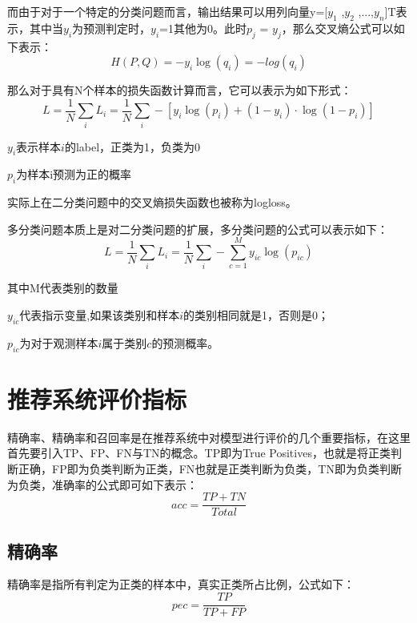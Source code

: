 而由于对于一个特定的分类问题而言，输出结果可以用列向量y=[$y_{1}$ ,$y_{2}$ ,...,$y_{n}$]$\mathrm{T}$表示，其中当$y_{i}$为预测判定时，$y_{i}$=1其他为0。此时$p_{j}$ = $y_{j}$，那么交叉熵公式可以如下表示：
\begin{equation}
  H(P, Q) = -y_{i}\log(q_{i}) = -log(q_{i})
\end{equation}

那么对于具有N个样本的损失函数计算而言，它可以表示为如下形式：
\begin{equation}
  L = \frac{1}{N}{\sum_{i} L_{i}} = \frac{1}{N}{\sum_{i} -[y_{i}\log(p_{i}) + (1 - y_{i}) \cdot {\log(1-p_{i})}]}
\end{equation}

$y_{i}$表示样本$i$的label，正类为1，负类为0

$p_{i}$为样本i预测为正的概率

实际上在二分类问题中的交叉熵损失函数也被称为logloss。

多分类问题本质上是对二分类问题的扩展，多分类问题的公式可以表示如下：
\begin{equation}
  L = \frac{1}{N}{\sum_{i} L_{i}} = \frac{1}{N}{\sum_{i} - \sum_{c=1}^{M}y_{ic}\log(p_{ic})}
\end{equation}



其中M代表类别的数量

$y_{ic}$代表指示变量,如果该类别和样本$i$的类别相同就是1，否则是0；

$p_{ic}$为对于观测样本$i$属于类别$c$的预测概率。

\section{推荐系统评价指标}

精确率、精确率和召回率是在推荐系统中对模型进行评价的几个重要指标，在这里首先要引入TP、FP、FN与TN的概念。TP即为True Positives，也就是将正类判断正确，FP即为负类判断为正类，FN也就是正类判断为负类，TN即为负类判断为负类，准确率的公式即可如下表示：
\begin{equation}
  acc = \frac{TP + TN}{Total}
\end{equation}

\subsection{精确率}

精确率是指所有判定为正类的样本中，真实正类所占比例，公式如下：
\begin{equation}
  pec = \frac{TP}{TP + FP}
\end{equation}


